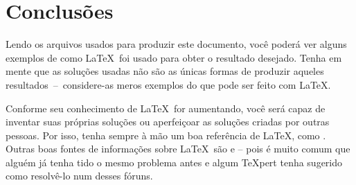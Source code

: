 
\chapter{Conclusões}

Lendo os arquivos  usados para produzir este documento, você
poderá ver alguns exemplos de como \LaTeX\ foi usado para obter o
resultado desejado. Tenha em mente que as soluções usadas não
são as únicas formas de produzir aqueles resultados~--~considere-as
meros exemplos do que pode ser feito com \LaTeX. 

Conforme seu
conhecimento de \LaTeX\ for aumentando, você será capaz de 
inventar suas próprias soluções ou aperfeiçoar as soluções
criadas por outras pessoas. Por isso, tenha sempre à mão
um boa referência de \LaTeX, como .
Outras boas fontes de informações sobre \LaTeX\ são 
\href{http://tex.stackexchange.com/questions}{} e
\href{http://www.latex-community.org/forum/}{} --
pois é muito comum que alguém já tenha tido o mesmo problema antes e 
algum \TeX{}pert tenha sugerido como resolvê-lo num desses fóruns. 